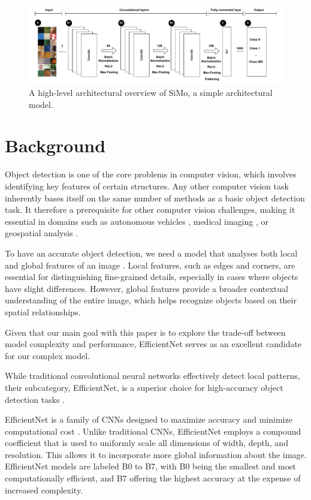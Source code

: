 \begin{figure}
    \centering
    \includegraphics[width=0.95\linewidth]{figures/SiMo-overview.pdf}
    \caption{A high-level architectural overview of SiMo, a simple architectural model.}
    \label{fig:design:f3}\label{fig:design:simo}
\end{figure}


\section{Background } \label{sec:background}

Object detection is one of the core problems in computer vision, which involves identifying key features of certain structures. Any other computer vision task inherently bases itself on the same number of methods as a basic object detection task. It therefore a prerequisite for other computer vision challenges, making it essential in domains such as autonomous vehicles \cite{DBLP:conf/cvpr/GeigerLU12}, medical imaging \cite{LITJENS201760}, or geospatial analysis \cite{9676295}.

To have an accurate object detection, we need a model that analyses both local and global features of an image \cite{DBLP:conf/clor/MurphyTEF06}. Local features, such as edges and corners, are essential for distinguishing fine-grained details, especially in cases where objects have slight differences. However, global features provide a broader contextual understanding of the entire image, which helps recognize objects based on their spatial relationships.

Given that our main goal with this paper is to explore the trade-off between model complexity and performance, EfficientNet serves as an excellent candidate for our complex model.

While traditional convolutional neural networks effectively detect local patterns, their subcategory, EfficientNet, is a superior choice for high-accuracy object detection tasks \cite{tan_efficientnet_2020}.

EfficientNet is a family of CNNs designed to maximize accuracy and minimize computational cost \cite{DBLP:conf/cvpr/TanPL20}. Unlike traditional CNNs, EfficientNet employs a compound coefficient that is used to uniformly scale all dimensions of width, depth, and resolution. This allows it to incorporate more global information about the image. EfficientNet models are labeled B0 to B7, with B0 being the smallest and most computationally efficient, and B7 offering the highest accuracy at the expense of increased complexity.

